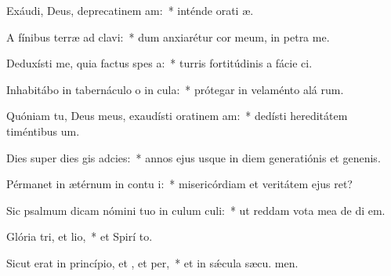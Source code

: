 \item Exáudi, Deus, deprecatinem am:~* inténde orati æ.
\item A fínibus terræ ad  clavi:~* dum anxiarétur cor meum, in petra  me.
\item Deduxísti me, quia factus  spes a:~* turris fortitúdinis a fácie ci.
\item Inhabitábo in tabernáculo o in cula:~* prótegar in velaménto alá rum.
\item Quóniam tu, Deus meus, exaudísti oratinem am:~* dedísti hereditátem timéntibus  um.
\item Dies super dies gis adcies:~* annos ejus usque in diem generatiónis et genenis.
\item Pérmanet in ætérnum in contu i:~* misericórdiam et veritátem ejus  ret?
\item Sic psalmum dicam nómini tuo in culum culi:~* ut reddam vota mea de di  em.
\item Glória tri, et lio,~* et Spirí to.
\item Sicut erat in princípio, et , et per,~* et in sǽcula sæcu. men.
